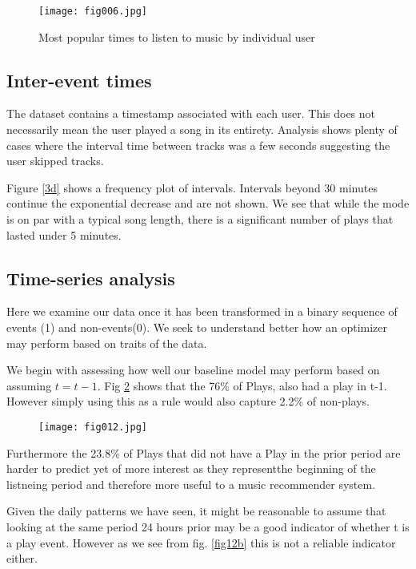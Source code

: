 \begin{figure}[h!]
	\centering
	\texttt{[image: fig006.jpg]}
	\caption{Most popular times to listen to music by individual user}
	\label{3c}
\end{figure} 

\subsection{Inter-event times}

The dataset contains a timestamp associated with each user. This does not necessarily mean the user played a song in its entirety. Analysis shows plenty of cases where the interval time between tracks was a few seconds suggesting the user skipped tracks. 

Figure \ref{3d} shows a frequency plot of intervals. Intervals beyond 30 minutes continue the exponential decrease and are not shown. We see that while the mode is on par with a typical song length, there is a significant number of plays that lasted under 5 minutes. 

\subsection{Time-series analysis}

Here we examine our data once it has been transformed in a binary sequence of events (1) and non-events(0). We seek to understand better how an optimizer may perform based on traits of the data.

We begin with assessing how well our baseline model may perform based on assuming $t = t-1$. Fig \ref{fig12} shows that the 76\% of Plays, also had a play in t-1. However simply using this as a rule would also capture 2.2\% of non-plays.

\begin{figure}[h!]
	\centering
	\texttt{[image: fig012.jpg]}
	\caption{}
	\label{fig12}
\end{figure} 

Furthermore the 23.8\% of Plays that did not have a Play in the prior period are harder to predict yet of more interest as they representthe beginning of the listneing period and therefore more useful to a music recommender system. 

Given the daily patterns we have seen, it might be reasonable to assume that looking at the same period 24 hours prior may be a good indicator of whether t is a play event. However as we see from fig. \ref{fig12b} this is not a reliable indicator either.

